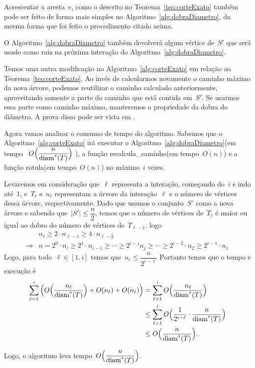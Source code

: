 		Acrescentar a aresta~$e$, como o descrito no
		Teorema~\ref{teo:corteExato} também pode ser feito de 
		forma mais simples no Algoritmo~\ref{alg:dobraDiametro},
		da mesma forma que foi feito o procedimento citado acima.

		O Algoritmo~\ref{alg:dobraDiametro} também devolverá 
		algum vértice de~$S'$ que será usado como raiz na 
		próxima interação do Algoritmo~\ref{alg:dobraDiametro}.

		Temos uma outra modificação no Algoritmo~\ref{alg:corteExato}   
		em relação ao Teorema~\ref{teo:corteExato}.
		Ao invés de calcularmos novamente o caminho máximo da nova
		árvore, podemos reutilizar o caminho calculado anteriormente,
		aproveitando somente a parte do caminho que está contida 
		em~$S'$. 
		Se usarmos essa parte como caminho máximo,
		manteremos a propriedade da dobra do diâmetro.
		A prova disso pode ser vista em {\cite{Schmidt15}}.

		\bigskip

		Agora vamos analisar o consumo de tempo do algoritmo.
		Sabemos que o Algoritmo~\ref{alg:corteExato} irá executar
		o Algoritmo~\ref{alg:dobraDiametro}(em 
		tempo ~${O\Big(\dfrac{n}{\mathrm{diam}^*(T)}\Big)}$ ), a função
		{\sc recalcula\_caminho}(em tempo~$O(n)$) e a função
		{\sc rotula}(em tempo~$O(n)$) no máximo~$i$ vezes.

		Levaremos em consideração que~$\ell$ representa a interação,
		começando do~$i$ e indo até~1, e~$T_\ell$ e~$n_\ell$ 
		representam a árvore da interação~$\ell$ e
		o número de vértices dessa árvore, respectivamente.
		Dado que usamos o conjunto~$S'$ como a nova árvore
		e sabendo que~$|S'|\le \dfrac{n}{2}$,
		temos que o número de vértices de~$T_{\ell}$
		é maior ou igual ao 
		dobro do número de vértices de~$T_{\ell-1}$, logo
		\begin{align}
			 & n_{\ell} \ge 2\cdot n_{\ell-1} \ge 4\cdot n_{\ell-2} \nonumber\\
			\Rightarrow & n = 2^0\cdot n_i\ge 2^1\cdot n_{i-1} \ge\cdots\ge
			2^{i-j}n_j\ge\cdots\ge
			 2^{i-2}\cdot n_{2}\ge 2^{i-1}\cdot n_1 \nonumber 
		\end{align}
		Logo, para todo~$\ell\in[1,i]$ temos que~$n_\ell \le\dfrac{n} {2^{i-\ell}}$
		Portanto temos que o tempo e execução é
		\begin{align}
			\displaystyle\sum_{\ell=1}^{i} \Big(O\Big(\dfrac{n_\ell}{\mathrm{diam}^*(T)}\Big)
			+ O(n_\ell) + O(n_\ell)\Big)
			&= \displaystyle\sum_{\ell=1}^{i} O\Big(\dfrac{n_\ell}{\mathrm{diam}^*(T)}\Big) \nonumber\\
			&\le \displaystyle\sum_{\ell=1}^{i} O\Big(\dfrac{1}{2^{i-\ell}}
			\cdot\dfrac{n}{\mathrm{diam}^*(T)}\Big) \nonumber\\
			&\le O\Big(\dfrac{n}{\mathrm{diam}^*(T)}\Big). \nonumber
		\end{align}

		Logo, o algoritmo leva tempo~$O\Big(\dfrac{n}{\mathrm{diam}^*(T)}\Big)$.
